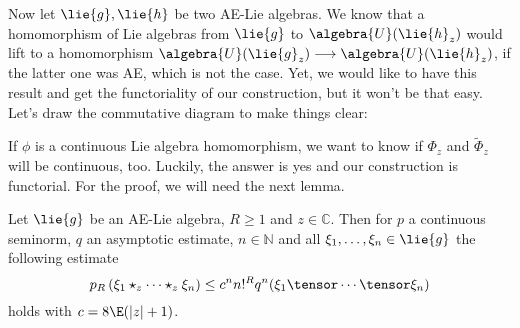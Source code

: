 Now let $\lie{g}, \lie{h}$ be two AE-Lie algebras. We know that a homomorphism 
of Lie algebras from $\lie{g}$ to $\algebra{U}(\lie{h}_z)$ would lift to a 
homomorphism $\algebra{U}(\lie{g}_z) \longrightarrow \algebra{U}(\lie{h}_z)$, 
if the latter one was AE, which is not the case. Yet, we would like to have 
this result and get the functoriality of our construction, but it won't be 
that easy. Let's draw the commutative diagram to make things clear:
\begin{center}
\end{center}
If $\phi$ is a continuous Lie algebra homomorphism, we want to know if 
$\Phi_z$ and $\widetilde{\Phi}_z$ will be continuous, too. Luckily, the answer 
is yes and our construction is functorial. For the proof, we will need the 
next lemma.
\begin{lemma}
    \label{LCAna:Lemma:LemmaPreContinuityN}%
    Let $\lie{g}$ be an AE-Lie algebra, $R \geq 1$ and $z \in
    \mathbb{C}$. Then for $p$ a continuous seminorm, $q$ an
    asymptotic estimate, $n \in \mathbb{N}$ and all $\xi_1, \ldots,
    \xi_n \in \lie{g}$ the following estimate
    \begin{equation}
        \label{LCAna:LemmaPreContinuityN}
        p_R \left(
            \xi_1 \star_z \cdots \star_z \xi_n
        \right)
        \leq
        c^n n!^R
        q^n(\xi_1 \tensor \cdots \tensor \xi_n)
    \end{equation}
    holds with $c = 8 \E (|z| + 1)$.
\end{lemma}
